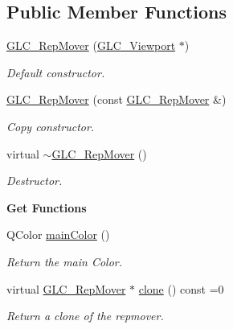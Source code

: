 \subsection*{Public Member Functions}
\begin{DoxyCompactItemize}
\item 
\hyperlink{class_g_l_c___rep_mover_a6ecbf27685fd20ccef333771c19d5ea5}{G\-L\-C\-\_\-\-Rep\-Mover} (\hyperlink{class_g_l_c___viewport}{G\-L\-C\-\_\-\-Viewport} $\ast$)
\begin{DoxyCompactList}\small\item\em Default constructor. \end{DoxyCompactList}\item 
\hyperlink{class_g_l_c___rep_mover_adbe1f9335886e8656a9db0cd81afb564}{G\-L\-C\-\_\-\-Rep\-Mover} (const \hyperlink{class_g_l_c___rep_mover}{G\-L\-C\-\_\-\-Rep\-Mover} \&)
\begin{DoxyCompactList}\small\item\em Copy constructor. \end{DoxyCompactList}\item 
virtual \hyperlink{class_g_l_c___rep_mover_a949ca09472fc3c5933b0c82824177334}{$\sim$\-G\-L\-C\-\_\-\-Rep\-Mover} ()
\begin{DoxyCompactList}\small\item\em Destructor. \end{DoxyCompactList}\end{DoxyCompactItemize}
\begin{Indent}{\bf Get Functions}\par
\begin{DoxyCompactItemize}
\item 
Q\-Color \hyperlink{class_g_l_c___rep_mover_ad7805d995b80ef093fdd89e3b799cc64}{main\-Color} ()
\begin{DoxyCompactList}\small\item\em Return the main Color. \end{DoxyCompactList}\item 
virtual \hyperlink{class_g_l_c___rep_mover}{G\-L\-C\-\_\-\-Rep\-Mover} $\ast$ \hyperlink{class_g_l_c___rep_mover_a1e962ea5a705a4262290994ac20f7008}{clone} () const =0
\begin{DoxyCompactList}\small\item\em Return a clone of the repmover. \end{DoxyCompactList}\end{DoxyCompactItemize}
\end{Indent}
